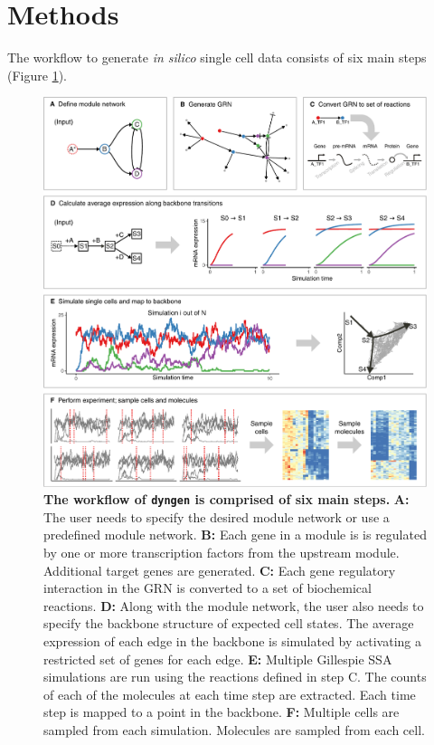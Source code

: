 \section{Methods}
The workflow to generate \textit{in silico} single cell data consists of six main steps (Figure \ref{fig:explain_methods}). 

\begin{figure}[htb!]
	\centering
	\includegraphics[width=\hugefigure]{fig/explain_methods} 
	\caption{\textbf{The workflow of \texttt{dyngen} is comprised of six main steps.} \textbf{A:} The user needs to specify the desired module network or use a predefined module network. \textbf{B:} Each gene in a module is is regulated by one or more transcription factors from the upstream module. Additional target genes are generated. \textbf{C:} Each gene regulatory interaction in the GRN is converted to a set of biochemical reactions. \textbf{D:} Along with the module network, the user also needs to specify the backbone structure of expected cell states. The average expression of each edge in the backbone is simulated by activating a restricted set of genes for each edge. \textbf{E:} Multiple Gillespie SSA simulations are run using the reactions defined in step C.  The counts of each of the molecules at each time step are extracted. Each time step is mapped to a point in the backbone. \textbf{F:} Multiple cells are sampled from each simulation. Molecules are sampled from each cell.}
	\label{fig:explain_methods}
\end{figure}

